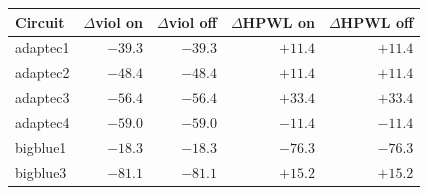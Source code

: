 \begin{tabular}{lrrrr}
\toprule
Circuit & $\Delta$viol on & $\Delta$viol off & $\Delta$HPWL on & $\Delta$HPWL off \\
\midrule
adaptec1 & $-39.3$ & $-39.3$ & $+11.4$ & $+11.4$ \\
adaptec2 & $-48.4$ & $-48.4$ & $+11.4$ & $+11.4$ \\
adaptec3 & $-56.4$ & $-56.4$ & $+33.4$ & $+33.4$ \\
adaptec4 & $-59.0$ & $-59.0$ & $-11.4$ & $-11.4$ \\
bigblue1 & $-18.3$ & $-18.3$ & $-76.3$ & $-76.3$ \\
bigblue3 & $-81.1$ & $-81.1$ & $+15.2$ & $+15.2$ \\
\bottomrule
\end{tabular}